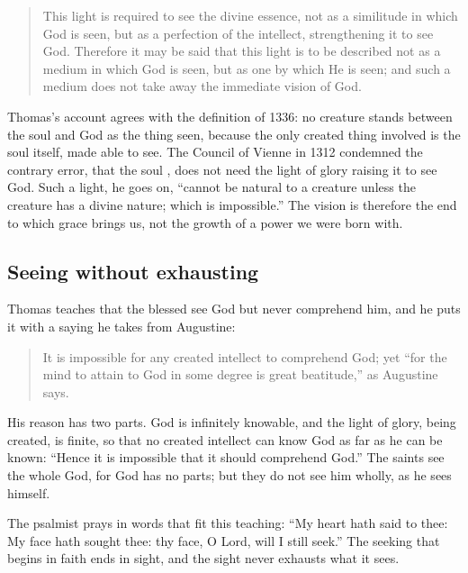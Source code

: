 \begin{quote}
This light is required to see the divine essence, not as a similitude in which God is seen, but as a perfection of the intellect, strengthening it to see God. Therefore it may be said that this light is to be described not as a medium in which God is seen, but as one by which He is seen; and such a medium does not take away the immediate vision of God.
\end{quote}

Thomas's account agrees with the definition of 1336: no creature stands between the soul and God as the thing seen, because the only created thing involved is the soul itself, made able to see. The Council of Vienne in 1312 condemned the contrary error, that the soul , does not need the light of glory raising it to see God. Such a light, he goes on, ``cannot be natural to a creature unless the creature has a divine nature; which is impossible.'' The vision is therefore the end to which grace brings us, not the growth of a power we were born with.

\subsection{Seeing without exhausting}

Thomas teaches that the blessed see God but never comprehend him, and he puts it with a saying he takes from Augustine:

\begin{quote}
It is impossible for any created intellect to comprehend God; yet ``for the mind to attain to God in some degree is great beatitude,'' as Augustine says.
\end{quote}

His reason has two parts. God is infinitely knowable, and the light of glory, being created, is finite, so that no created intellect can know God as far as he can be known: ``Hence it is impossible that it should comprehend God.'' The saints see the whole God, for God has no parts; but they do not see him wholly, as he sees himself.

The psalmist prays in words that fit this teaching: ``My heart hath said to thee: My face hath sought thee: thy face, O Lord, will I still seek.'' The seeking that begins in faith ends in sight, and the sight never exhausts what it sees.
